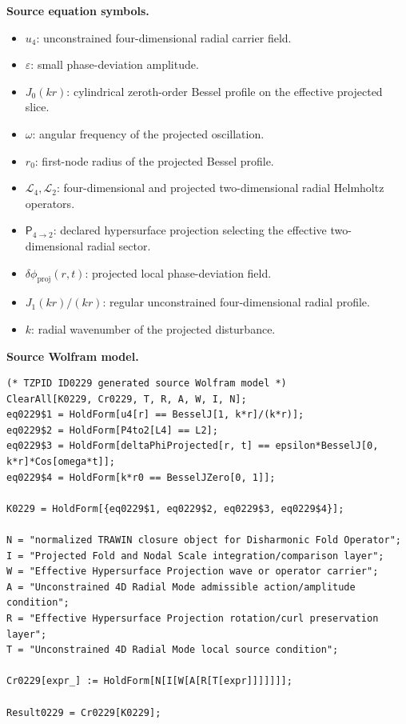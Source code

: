 \begin{minipage}[t]{0.49\linewidth}
\begingroup
\small
\raggedright
\textbf{Source equation symbols.}\par
\begin{itemize}[leftmargin=1.35em,itemsep=1pt,topsep=1pt,parsep=0pt]
    \item $u_4$: unconstrained four-dimensional radial carrier field.
    \item $\varepsilon$: small phase-deviation amplitude.
    \item $J_0(kr)$: cylindrical zeroth-order Bessel profile on the effective projected slice.
    \item $\omega$: angular frequency of the projected oscillation.
    \item $r_0$: first-node radius of the projected Bessel profile.
    \item $\mathcal{L}_4,\mathcal{L}_2$: four-dimensional and projected two-dimensional radial Helmholtz operators.
    \item $\mathsf{P}_{4\to2}$: declared hypersurface projection selecting the effective two-dimensional radial sector.
    \item $\delta\phi_{\mathrm{proj}}(r,t)$: projected local phase-deviation field.
    \item $J_1(k r)/(k r)$: regular unconstrained four-dimensional radial profile.
    \item $k$: radial wavenumber of the projected disturbance.
\end{itemize}
\endgroup
\end{minipage}\hfill
\begin{minipage}[t]{0.47\linewidth}
\begingroup
\scriptsize
\raggedright
\textbf{Source Wolfram model.}\par
\begin{Verbatim}[fontsize=\tiny,breaklines=true,breakanywhere=true]
(* TZPID ID0229 generated source Wolfram model *)
ClearAll[K0229, Cr0229, T, R, A, W, I, N];
eq0229$1 = HoldForm[u4[r] == BesselJ[1, k*r]/(k*r)];
eq0229$2 = HoldForm[P4to2[L4] == L2];
eq0229$3 = HoldForm[deltaPhiProjected[r, t] == epsilon*BesselJ[0, k*r]*Cos[omega*t]];
eq0229$4 = HoldForm[k*r0 == BesselJZero[0, 1]];

K0229 = HoldForm[{eq0229$1, eq0229$2, eq0229$3, eq0229$4}];

N = "normalized TRAWIN closure object for Disharmonic Fold Operator";
I = "Projected Fold and Nodal Scale integration/comparison layer";
W = "Effective Hypersurface Projection wave or operator carrier";
A = "Unconstrained 4D Radial Mode admissible action/amplitude condition";
R = "Effective Hypersurface Projection rotation/curl preservation layer";
T = "Unconstrained 4D Radial Mode local source condition";

Cr0229[expr_] := HoldForm[N[I[W[A[R[T[expr]]]]]]];

Result0229 = Cr0229[K0229];
\end{Verbatim}
\endgroup
\end{minipage}

